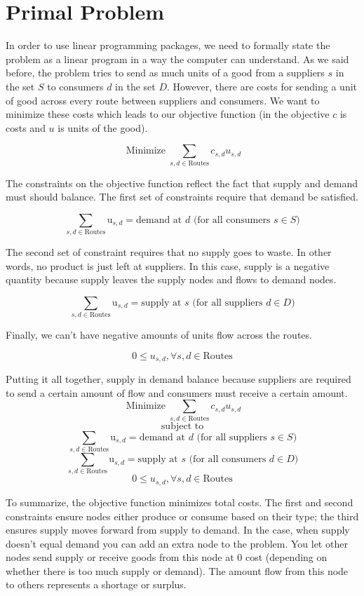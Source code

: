 \documentclass{report}
\begin{document}
\section{Primal Problem}

In order to use linear programming packages, we need to formally state the problem as a linear program in a way the computer can understand. As we said before, the problem tries to send as much units of a good from a suppliers $s$ in the set $S$ to consumers $d$ in the set $D$. However, there are costs for sending a unit of good across every route between suppliers and consumers. We want to minimize these costs which leads to our objective function (in the objective $c$ is costs and $u$ is units of the good). 

$$\operatorname{Minimize} \sum_{s,d \in \text{Routes}} c_{s,d} u_{s,d}$$

The constraints on the objective function reflect the fact that supply and demand must should balance. The first set of constraints require that demand be satisfied.

$$\sum_{s,d \in \text{Routes}} \text{u}_{s,d}= \text{demand at } d \text{ (for all consumers } s \in S)$$

The second set of constraint requires that no supply goes to waste. In other words, no product is just left at suppliers. In this case, supply is a negative quantity because supply leaves the supply nodes and flows to demand nodes.

$$\sum_{s,d \in \text{Routes}} \text{u}_{s,d}= \text{supply at } s \text{ (for all suppliers } d \in D)$$

Finally, we can't have negative amounts of units flow across the routes.

$$0 \leq u_{s,d}, \forall s,d \in \text{Routes}$$

Putting it all together, supply in demand balance because suppliers are required to send a certain amount of flow and consumers must receive a certain amount.
$$\operatorname{Minimize} \sum_{s,d \in \text{Routes}} c_{s,d} u_{s,d}$$
$$\text{subject to}$$
$$\sum_{s,d \in \text{Routes}} \text{u}_{s,d}= \text{demand at } d \text{ (for all suppliers } s \in S)$$
$$\sum_{s,d \in \text{Routes}} \text{u}_{s,d}= \text{supply at } s \text{ (for all consumers } d \in D)$$
$$0 \leq u_{s,d}, \forall s,d \in \text{Routes}$$

To summarize, the objective function minimizes total costs. The first and second constraints ensure nodes either produce or consume based on their type; the third ensures supply moves forward from supply to demand.  In the case, when supply doesn't equal demand you can add an extra node to the problem. You let other nodes send supply or receive goods from this node at 0 cost (depending on whether there is too much supply or demand). The amount flow from this node to others represents a shortage or surplus.
\end{document}
